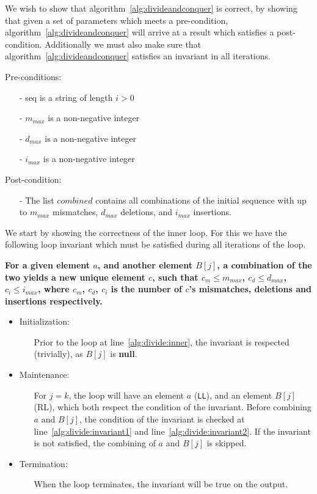 \documentclass[12pt]{article}
\theoremstyle{definition}
\newcounter{subsubsubsection}[subsubsection]
\begin{document}

We wish to show that algorithm~\ref{alg:divideandconquer} is correct, by showing that given a set of parameters which meets a pre-condition, algorithm~\ref{alg:divideandconquer} will arrive at a result which satisfies a post-condition. Additionally we must also make sure that algorithm~\ref{alg:divideandconquer} satisfies an invariant in all iterations.

Pre-conditions:
\begin{itemize}
\item[-] seq is a string of length $i > 0$
\item[-] $m_{max}$ is a non-negative integer
\item[-] $d_{max}$ is a non-negative integer
\item[-] $i_{max}$ is a non-negative integer
\end{itemize}

Post-condition:
\begin{itemize}
\item[-] The list $combined$ contains all combinations of the initial sequence with up to  $m_{max}$ mismatches, $d_{max}$ deletions, and $i_{max}$ insertions.
\end{itemize}


We start by showing the correctness of the inner loop. For this we have the following loop invariant which must be satisfied during all iterations of the loop.

\textbf{For a given element $a$, and another element $B[j]$, a combination of the two yields a new unique element $c$, such that $c_m \leq m_{max}$, $c_d \leq d_{max}$, $c_i \leq i_{max}$, where $c_m$, $c_d$, $c_i$ is the number of $c$'s mismatches, deletions and insertions respectively.}

\begin{itemize}
\item Initialization:
\begin{itemize}
	\item[] Prior to the loop at line~\ref{alg:divide:inner}, the invariant is respected (trivially), as $B[j]$ is \textbf{null}.
\end{itemize}

\item Maintenance:
\begin{itemize}
	\item[] For $j = k$, the loop will have an element $a$ (\texttt{LL}), and an element $B[j]$ (RL), which both respect the condition of the invariant. Before combining $a$ and $B[j]$, the condition of the invariant is checked at line~\ref{alg:divide:invariant1} and line~\ref{alg:divide:invariant2}. If the invariant is not satisfied, the combining of $a$ and $B[j]$ is skipped.
\end{itemize}

\item Termination:
\begin{itemize}
	\item[] When the loop terminates, the invariant will be true on the output.
\end{itemize}
\end{itemize}
\end{document}
